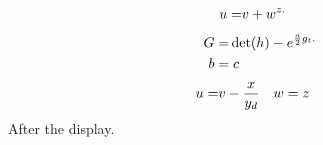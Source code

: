 \documentclass{article}
\begin{document}
\begin{equation*}
\begin{aligned}
u &= }v+w^{z.
\end{aligned}
\end{equation*}
\[\begin{aligned} G &= }\det(h)-e^{\frac{a}{2}g_t. \\ b&=c \end{aligned}\]
\[\begin{aligned} u &= }v - \frac{x}{y_{d} & w &= z \end{aligned}\]
After the display.
\end{document}
